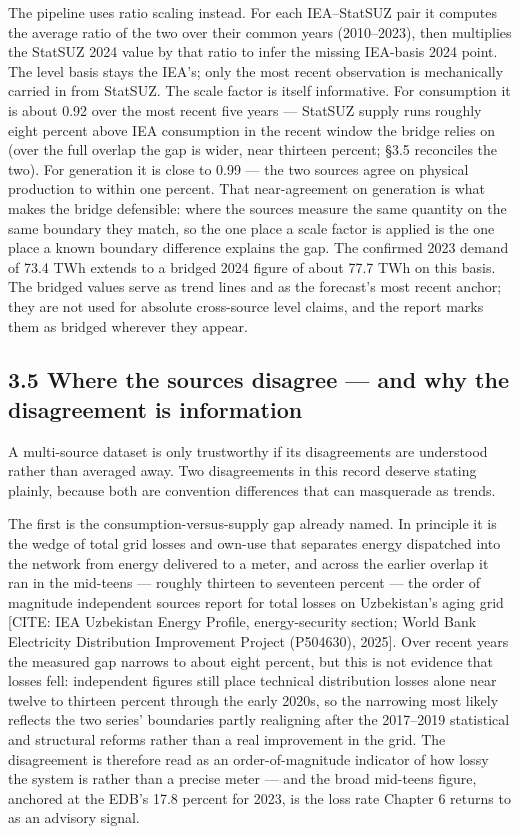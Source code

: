 \documentclass[10pt,twocolumn]{article}
\newcommand{\mk}[1]{{\color{amber}\small #1}}
\begin{document}
The pipeline uses ratio scaling instead. For each IEA--StatSUZ pair it computes the average ratio of the two over their common years (2010--2023), then multiplies the StatSUZ 2024 value by that ratio to infer the missing IEA-basis 2024 point. The level basis stays the IEA's; only the most recent observation is mechanically carried in from StatSUZ. The scale factor is itself informative. For consumption it is about 0.92 over the most recent five years --- StatSUZ supply runs roughly eight percent above IEA consumption in the recent window the bridge relies on (over the full overlap the gap is wider, near thirteen percent; \S{}3.5 reconciles the two). For generation it is close to 0.99 --- the two sources agree on physical production to within one percent. That near-agreement on generation is what makes the bridge defensible: where the sources measure the same quantity on the same boundary they match, so the one place a scale factor is applied is the one place a known boundary difference explains the gap. The confirmed 2023 demand of 73.4 TWh extends to a bridged 2024 figure of about 77.7 TWh on this basis. The bridged values serve as trend lines and as the forecast's most recent anchor; they are not used for absolute cross-source level claims, and the report marks them as bridged wherever they appear.

\subsection*{3.5 Where the sources disagree --- and why the disagreement is information}

A multi-source dataset is only trustworthy if its disagreements are understood rather than averaged away. Two disagreements in this record deserve stating plainly, because both are convention differences that can masquerade as trends.

The first is the consumption-versus-supply gap already named. In principle it is the wedge of total grid losses and own-use that separates energy dispatched into the network from energy delivered to a meter, and across the earlier overlap it ran in the mid-teens --- roughly thirteen to seventeen percent --- the order of magnitude independent sources report for total losses on Uzbekistan's aging grid \mk{[CITE: IEA Uzbekistan Energy Profile, energy-security section; World Bank Electricity Distribution Improvement Project (P504630), 2025]}. Over recent years the measured gap narrows to about eight percent, but this is not evidence that losses fell: independent figures still place technical distribution losses alone near twelve to thirteen percent through the early 2020s, so the narrowing most likely reflects the two series' boundaries partly realigning after the 2017--2019 statistical and structural reforms rather than a real improvement in the grid. The disagreement is therefore read as an order-of-magnitude indicator of how lossy the system is rather than a precise meter --- and the broad mid-teens figure, anchored at the EDB's 17.8 percent for 2023, is the loss rate Chapter 6 returns to as an advisory signal.
\end{document}
